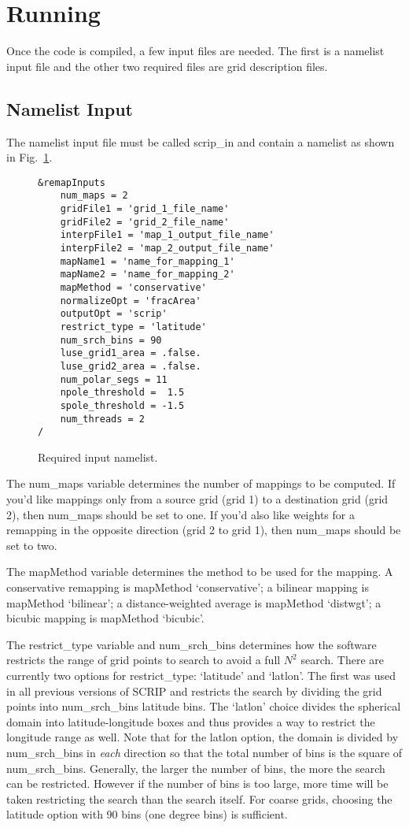 \documentclass[12pt]{report}
\begin{document}
\section{Running}

Once the code is compiled, a few input files are needed.
The first is a namelist input file and the other two
required files are grid description files.

\subsection{Namelist Input}

The namelist input file must be called scrip\_in
and contain a namelist as shown in Fig.~\ref{fig:nml}.

\begin{figure}
\caption{Required input namelist. \label{fig:nml}}
\begin{verbatim}
&remapInputs
    num_maps = 2
    gridFile1 = 'grid_1_file_name'
    gridFile2 = 'grid_2_file_name'
    interpFile1 = 'map_1_output_file_name'
    interpFile2 = 'map_2_output_file_name'
    mapName1 = 'name_for_mapping_1'
    mapName2 = 'name_for_mapping_2'
    mapMethod = 'conservative'
    normalizeOpt = 'fracArea'
    outputOpt = 'scrip'
    restrict_type = 'latitude'
    num_srch_bins = 90
    luse_grid1_area = .false.
    luse_grid2_area = .false.
    num_polar_segs = 11
    npole_threshold =  1.5
    spole_threshold = -1.5
    num_threads = 2
/
\end{verbatim}
\end{figure}

The num\_maps variable determines the number of mappings
to be computed.  If you'd like mappings only from a source
grid (grid 1) to a destination grid (grid 2), then
num\_maps should be set to one.  If you'd also like weights
for a remapping in the opposite direction (grid 2 to grid 1),
then num\_maps should be set to two.

The mapMethod variable determines the method to be used
for the mapping.  A conservative remapping is mapMethod
`conservative'; a bilinear mapping is mapMethod `bilinear';
a distance-weighted average is mapMethod `distwgt'; a
bicubic mapping is mapMethod `bicubic'.

The restrict\_type variable and num\_srch\_bins determines
how the software restricts the range of grid points to search
to avoid a full $N^2$ search.  There are currently two options
for restrict\_type: `latitude' and `latlon'.  The first was used in
all previous versions of SCRIP and restricts the search by
dividing the grid points into num\_srch\_bins latitude bins.
The `latlon' choice divides the spherical domain into
latitude-longitude boxes and thus provides a way to
restrict the longitude range as well.  Note that for the latlon
option, the domain is divided by num\_srch\_bins in
{\em each} direction so that the total number of bins is the
square of num\_srch\_bins.  Generally, the larger the number
of bins, the more the search can be restricted.  However if
the number of bins is too large, more time will be taken
restricting the search than the search itself.  For coarse
grids, choosing the latitude option with 90 bins (one degree
bins) is sufficient.
\end{document}
